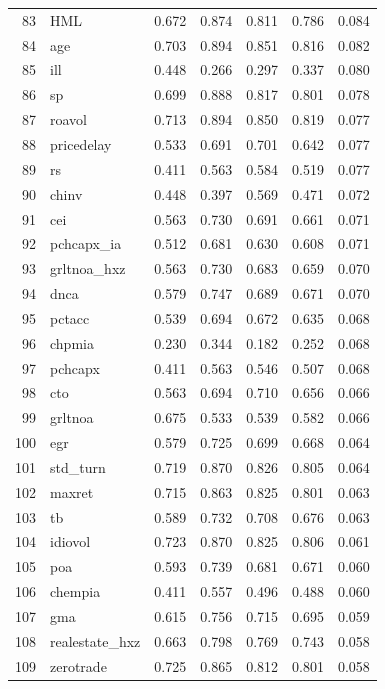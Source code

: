 \documentclass[12pt]{article}
\begin{document}
\begin{footnotesize}
\begin{longtable}{rl|c|c|c|c|c}
		83 & HML & 0.672 & 0.874 & 0.811 & 0.786 & 0.084 \\ 
		84 & age & 0.703 & 0.894 & 0.851 & 0.816 & 0.082 \\ 
		85 & ill & 0.448 & 0.266 & 0.297 & 0.337 & 0.080 \\ 
		86 & sp & 0.699 & 0.888 & 0.817 & 0.801 & 0.078 \\ 
		87 & roavol & 0.713 & 0.894 & 0.850 & 0.819 & 0.077 \\ 
		88 & pricedelay & 0.533 & 0.691 & 0.701 & 0.642 & 0.077 \\ 
		89 & rs & 0.411 & 0.563 & 0.584 & 0.519 & 0.077 \\ 
		90 & chinv & 0.448 & 0.397 & 0.569 & 0.471 & 0.072 \\ 
		91 & cei & 0.563 & 0.730 & 0.691 & 0.661 & 0.071 \\ 
		92 & pchcapx\_ia & 0.512 & 0.681 & 0.630 & 0.608 & 0.071 \\ 
		93 & grltnoa\_hxz & 0.563 & 0.730 & 0.683 & 0.659 & 0.070 \\ 
		94 & dnca & 0.579 & 0.747 & 0.689 & 0.671 & 0.070 \\ 
		95 & pctacc & 0.539 & 0.694 & 0.672 & 0.635 & 0.068 \\ 
		96 & chpmia & 0.230 & 0.344 & 0.182 & 0.252 & 0.068 \\ 
		97 & pchcapx & 0.411 & 0.563 & 0.546 & 0.507 & 0.068 \\ 
		98 & cto & 0.563 & 0.694 & 0.710 & 0.656 & 0.066 \\ 
		99 & grltnoa & 0.675 & 0.533 & 0.539 & 0.582 & 0.066 \\ 
		100 & egr & 0.579 & 0.725 & 0.699 & 0.668 & 0.064 \\ 
		101 & std\_turn & 0.719 & 0.870 & 0.826 & 0.805 & 0.064 \\ 
		102 & maxret & 0.715 & 0.863 & 0.825 & 0.801 & 0.063 \\ 
		103 & tb & 0.589 & 0.732 & 0.708 & 0.676 & 0.063 \\ 
		104 & idiovol & 0.723 & 0.870 & 0.825 & 0.806 & 0.061 \\ 
		105 & poa & 0.593 & 0.739 & 0.681 & 0.671 & 0.060 \\ 
		106 & chempia & 0.411 & 0.557 & 0.496 & 0.488 & 0.060 \\ 
		107 & gma & 0.615 & 0.756 & 0.715 & 0.695 & 0.059 \\ 
		108 & realestate\_hxz & 0.663 & 0.798 & 0.769 & 0.743 & 0.058 \\ 
		109 & zerotrade & 0.725 & 0.865 & 0.812 & 0.801 & 0.058 \\ 

\end{longtable}
\end{footnotesize}
\end{document}
